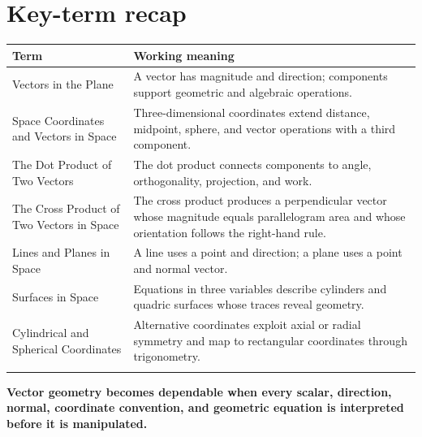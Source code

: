 \documentclass[11pt]{article}
\begin{document}
\section{Key-term recap}
\small
\begin{longtable}{@{}>{\RaggedRight\arraybackslash}p{}>{\RaggedRight\arraybackslash}p{}@{}}
\toprule
\textbf{Term} & \textbf{Working meaning}\\
\midrule\endhead
Vectors in the Plane & A vector has magnitude and direction; components support geometric and algebraic operations. \\\addlinespace[2pt]
Space Coordinates and Vectors in Space & Three-dimensional coordinates extend distance, midpoint, sphere, and vector operations with a third component. \\\addlinespace[2pt]
The Dot Product of Two Vectors & The dot product connects components to angle, orthogonality, projection, and work. \\\addlinespace[2pt]
The Cross Product of Two Vectors in Space & The cross product produces a perpendicular vector whose magnitude equals parallelogram area and whose orientation follows the right-hand rule. \\\addlinespace[2pt]
Lines and Planes in Space & A line uses a point and direction; a plane uses a point and normal vector. \\\addlinespace[2pt]
Surfaces in Space & Equations in three variables describe cylinders and quadric surfaces whose traces reveal geometry. \\\addlinespace[2pt]
Cylindrical and Spherical Coordinates & Alternative coordinates exploit axial or radial symmetry and map to rectangular coordinates through trigonometry. \\\addlinespace[2pt]
\bottomrule
\end{longtable}
\normalsize

\enlargethispage{4\baselineskip}
\begin{tcolorbox}[title=One-sentence takeaway,fonttitle=\bfseries,colback=Ink,colframe=Ink,coltext=white,coltitle=white,arc=2mm,boxrule=0pt]
\centering\bfseries Vector geometry becomes dependable when every scalar, direction, normal, coordinate convention, and geometric equation is interpreted before it is manipulated.
\end{tcolorbox}
\end{document}
